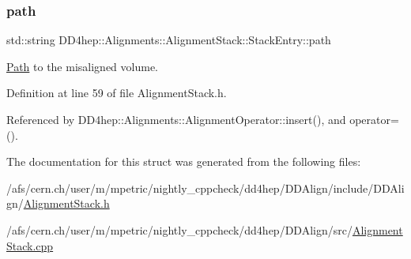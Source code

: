 \subsubsection{\texorpdfstring{path}{path}}
{\footnotesize\ttfamily std\+::string D\+D4hep\+::\+Alignments\+::\+Alignment\+Stack\+::\+Stack\+Entry\+::path}



\hyperlink{class_d_d4hep_1_1_path}{Path} to the misaligned volume. 



Definition at line 59 of file Alignment\+Stack.\+h.



Referenced by D\+D4hep\+::\+Alignments\+::\+Alignment\+Operator\+::insert(), and operator=().



The documentation for this struct was generated from the following files\+:\begin{DoxyCompactItemize}
\item 
/afs/cern.\+ch/user/m/mpetric/nightly\+\_\+cppcheck/dd4hep/\+D\+D\+Align/include/\+D\+D\+Align/\hyperlink{_alignment_stack_8h}{Alignment\+Stack.\+h}\item 
/afs/cern.\+ch/user/m/mpetric/nightly\+\_\+cppcheck/dd4hep/\+D\+D\+Align/src/\hyperlink{_alignment_stack_8cpp}{Alignment\+Stack.\+cpp}\end{DoxyCompactItemize}
